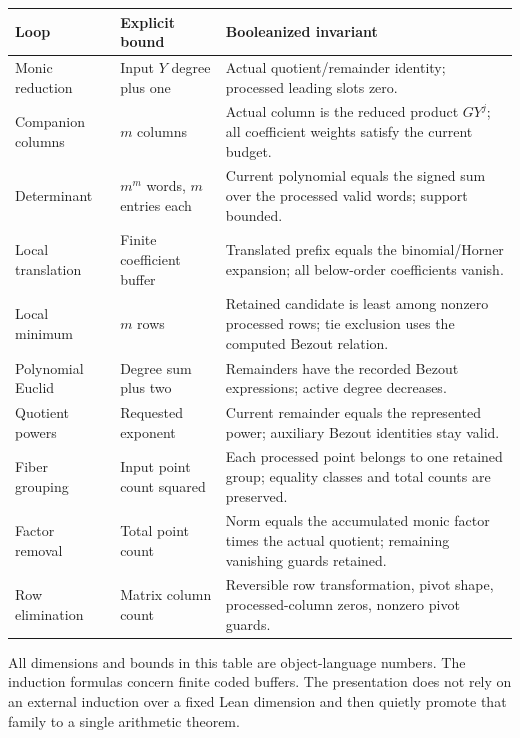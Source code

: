 \begin{longtable}{@{}P{0.22\textwidth}P{0.25\textwidth}P{0.47\textwidth}@{}}
\toprule
Loop & Explicit bound & Booleanized invariant\\
\midrule
\endhead
Monic reduction & Input $Y$ degree plus one & Actual quotient/remainder identity; processed leading slots zero.\\[3pt]
Companion columns & $m$ columns & Actual column is the reduced product $GY^j$; all coefficient weights satisfy the current budget.\\[3pt]
Determinant & $m^m$ words, $m$ entries each & Current polynomial equals the signed sum over the processed valid words; support bounded.\\[3pt]
Local translation & Finite coefficient buffer & Translated prefix equals the binomial/Horner expansion; all below-order coefficients vanish.\\[3pt]
Local minimum & $m$ rows & Retained candidate is least among nonzero processed rows; tie exclusion uses the computed Bezout relation.\\[3pt]
Polynomial Euclid & Degree sum plus two & Remainders have the recorded Bezout expressions; active degree decreases.\\[3pt]
Quotient powers & Requested exponent & Current remainder equals the represented power; auxiliary Bezout identities stay valid.\\[3pt]
Fiber grouping & Input point count squared & Each processed point belongs to one retained group; equality classes and total counts are preserved.\\[3pt]
Factor removal & Total point count & Norm equals the accumulated monic factor times the actual quotient; remaining vanishing guards retained.\\[3pt]
Row elimination & Matrix column count & Reversible row transformation, pivot shape, processed-column zeros, nonzero pivot guards.\\
\bottomrule
\end{longtable}

All dimensions and bounds in this table are object-language numbers. The induction formulas concern finite coded buffers. The presentation does not rely on an external induction over a fixed Lean dimension and then quietly promote that family to a single arithmetic theorem.

